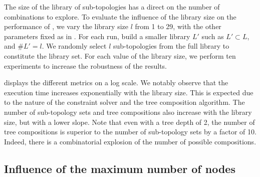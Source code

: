 The size of the library of sub-topologies has a direct on the number of combinations to explore.
To evaluate the influence of the library size on the performance of \thecontrib, we vary the library size $l$ from 1 to 29, with the other parameters fixed as in .
For each run, build a smaller library $L'$ such as $L' \subset L$, and $\#L' = l$.
We randomly select $l$ sub-topologies from the full library to constitute the library set.
For each value of the library size, we perform ten experiments to increase the robustness of the results.

 displays the different metrics on a log scale.
We notably observe that the execution time increases exponentially with the library size.
This is expected due to the nature of the constraint solver and the tree composition algorithm.
The number of sub-topology sets and tree compositions also increase with the library size, but with a lower slope.
Note that even with a tree depth of 2, the number of tree compositions is superior to the number of sub-topology sets by a factor of 10.
Indeed, there is a combinatorial explosion of the number of possible compositions.


\subsection{Influence of the maximum number of nodes\label{subsec:topologies.benchmark.nodes}}

